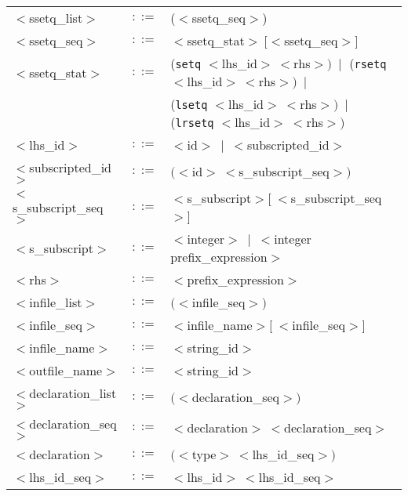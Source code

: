 \begin{center}
\begin{tabular}{lcl}
$<$ssetq\_list$>$ & $::=$ & ($<$ssetq\_seq$>$)\\
$<$ssetq\_seq$>$ & $::=$ & $<$ssetq\_stat$>~[<$ssetq\_seq$>]$\\
$<$ssetq\_stat$>$ & $::=$ & ({\tt setq} $<$lhs\_id$>~<$rhs$>)~\mid$
({\tt rsetq} $<$lhs\_id$>~<$rhs$>)~\mid$\\
 & & ({\tt lsetq} $<$lhs\_id$>~<$rhs$>)~\mid$
({\tt lrsetq} $<$lhs\_id$>~<$rhs$>)$\\
$<$lhs\_id$>$ & $::=$ & $<$id$>~\mid~<$subscripted\_id$>$\\
$<$subscripted\_id$>$ & $::=$ & $(<$id$>~<$s\_subscript\_seq$>)$\\
$<$s\_subscript\_seq$>$ & $::=$ & $<$s\_subscript$>[~<$s\_subscript\_seq$>$]\\
$<$s\_subscript$>$ & $::=$ & $<$integer$>~\mid~<$integer prefix\_expression$>$\\
$<$rhs$>$ & $::=$ & $<$prefix\_expression$>$\\
$<$infile\_list$>$ & $::=$ & $(<$infile\_seq$>)$\\
$<$infile\_seq$>$ & $::=$ & $<$infile\_name$>[~<$infile\_seq$>]$\\
$<$infile\_name$>$ & $::=$ & $<$string\_id$>$\\
$<$outfile\_name$>$ & $::=$ & $<$string\_id$>$\\
$<$declaration\_list$>$ & $::=$ & $(<$declaration\_seq$>)$\\
$<$declaration\_seq$>$ & $::=$ & $<$declaration$>~<$declaration\_seq$>$\\
$<$declaration$>$ & $::=$ & $(<$type$>~<$lhs\_id\_seq$>)$\\
$<$lhs\_id\_seq$>$ & $::=$ & $<$lhs\_id$>~<$lhs\_id\_seq$>$
\end{tabular}
\end{center}

